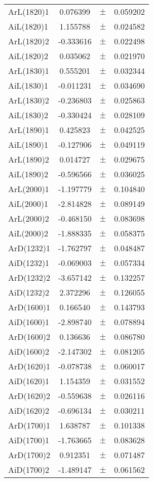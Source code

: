 \begin{table}
\begin{tiny}
\begin{tabular}{lccc}
ArL(1820)1 & 0.076399 & $\pm$ & 0.059202 \\
AiL(1820)1 & 1.155788 & $\pm$ & 0.024582 \\
ArL(1820)2 & -0.333616 & $\pm$ & 0.022498 \\
AiL(1820)2 & 0.035062 & $\pm$ & 0.021970 \\
ArL(1830)1 & 0.555201 & $\pm$ & 0.032344 \\
AiL(1830)1 & -0.011231 & $\pm$ & 0.034690 \\
ArL(1830)2 & -0.236803 & $\pm$ & 0.025863 \\
AiL(1830)2 & -0.330424 & $\pm$ & 0.028109 \\
ArL(1890)1 & 0.425823 & $\pm$ & 0.042525 \\
AiL(1890)1 & -0.127906 & $\pm$ & 0.049119 \\
ArL(1890)2 & 0.014727 & $\pm$ & 0.029675 \\
AiL(1890)2 & -0.596566 & $\pm$ & 0.036025 \\
ArL(2000)1 & -1.197779 & $\pm$ & 0.104840 \\
AiL(2000)1 & -2.814828 & $\pm$ & 0.089149 \\
ArL(2000)2 & -0.468150 & $\pm$ & 0.083698 \\
AiL(2000)2 & -1.888335 & $\pm$ & 0.058375 \\
ArD(1232)1 & -1.762797 & $\pm$ & 0.048487 \\
AiD(1232)1 & -0.069003 & $\pm$ & 0.057334 \\
ArD(1232)2 & -3.657142 & $\pm$ & 0.132257 \\
AiD(1232)2 & 2.372296 & $\pm$ & 0.126055 \\
ArD(1600)1 & 0.166540 & $\pm$ & 0.143793 \\
AiD(1600)1 & -2.898740 & $\pm$ & 0.078894 \\
ArD(1600)2 & 0.136636 & $\pm$ & 0.086780 \\
AiD(1600)2 & -2.147302 & $\pm$ & 0.081205 \\
ArD(1620)1 & -0.078738 & $\pm$ & 0.060017 \\
AiD(1620)1 & 1.154359 & $\pm$ & 0.031552 \\
ArD(1620)2 & -0.559638 & $\pm$ & 0.026116 \\
AiD(1620)2 & -0.696134 & $\pm$ & 0.030211 \\
ArD(1700)1 & 1.638787 & $\pm$ & 0.101338 \\
AiD(1700)1 & -1.763665 & $\pm$ & 0.083628 \\
ArD(1700)2 & 0.912351 & $\pm$ & 0.071487 \\
AiD(1700)2 & -1.489147 & $\pm$ & 0.061562 \\
\bottomrule
\end{tabular}
\end{tiny}
\end{table}

